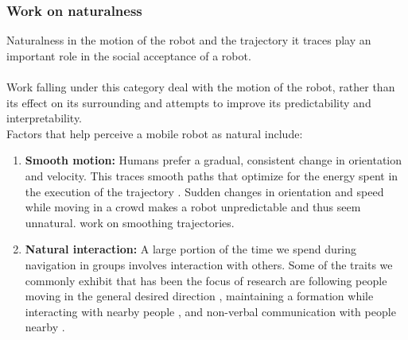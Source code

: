 \subsubsection{Work on naturalness}
 Naturalness in the motion of the robot and the trajectory it traces play an important role in the social acceptance of a robot. \\
\\Work falling under this category deal with the motion of the robot, rather than its effect on its surrounding and attempts to improve its predictability and interpretability.\\ %
Factors that help perceive a mobile robot as natural include:
\begin{enumerate}
    \item \textbf{Smooth motion:} Humans prefer a gradual, consistent change in orientation and velocity. This traces smooth paths that optimize for the energy spent in the execution of the trajectory \cite{arechavaleta_nonholonomic_2008}. Sudden changes in orientation and speed while moving in a crowd makes a robot unpredictable and thus seem unnatural. \cite{pandey_alami_robot_guide_2009, pandey_2010_human_centered_nav} work on smoothing trajectories.
    \item \textbf{Natural interaction:} A large portion of the time we spend during navigation in groups involves interaction with others. Some of the traits we commonly exhibit that has been the focus of research are following people moving in the general desired direction \cite{gockley_natural_person_following_2007}, maintaining a formation while interacting with nearby people \cite{althaus_nav_for_human_robot_interaction_2004}, and non-verbal communication with people nearby \cite{sauliner_minimal_nonverbal_interruption_2011}. 
    
\end{enumerate}
